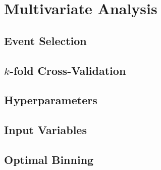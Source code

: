 \chapter{Multivariate Analysis}\label{cha:mva}

\section{Event Selection}\label{sec:mva:event_selection}

\section{$k$-fold Cross-Validation}\label{sec:mva:kfold-xval}

\section{Hyperparameters}\label{sec:mva:hyperparameters}

\section{Input Variables}\label{sec:mva:input_variables}

\section{Optimal Binning}\label{sec:mva:binning}
